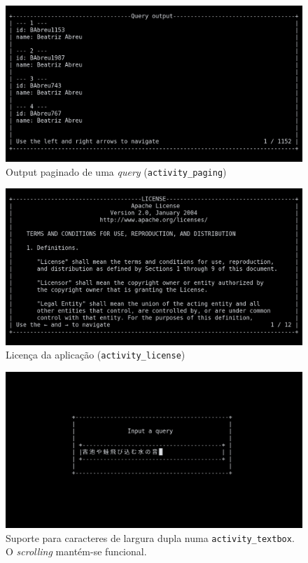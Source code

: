 \documentclass[11pt, a4paper]{article}
\begin{document}
\begin{figure}[H]
    \centering
    \includegraphics[scale=0.25]{res-fase2/interactive_screenshots/paging.png}
    \caption{Output paginado de uma \emph{query} (\texttt{activity\_paging})}
    \label{fig:paging}
\end{figure}

\begin{figure}[H]
    \centering
    \includegraphics[scale=0.25]{res-fase2/interactive_screenshots/license.png}
    \caption{Licença da aplicação (\texttt{activity\_license})}
    \label{fig:license}
\end{figure}

\begin{figure}[H]
    \centering
    \includegraphics[scale=0.25]{res-fase2/interactive_screenshots/japanese.png}
    \caption{Suporte para caracteres de largura dupla numa \texttt{activity\_textbox}.
             O \emph{scrolling} mantém-se funcional.}
    \label{fig:japanese}
\end{figure}
\end{document}

